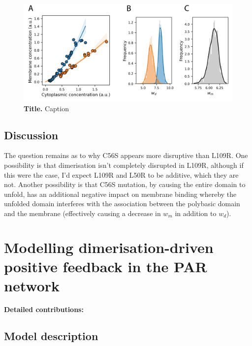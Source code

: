 \documentclass[12pt]{"report"}
\newcommand{\mycaption}[2]{\caption[#1]{\textbf{#1.} #2}}
\begin{document}
\begin{figure}[!h]
\includegraphics[scale=1]{thermodynamic_model_wt_vs_l109r}
\setlength{\abovecaptionskip}{20pt}
\centering
\mycaption{Title}{Caption}
\label{fig:thermodynamic_model_wt_vs_l109r}
\end{figure}


\section{Discussion}



The question remains as to why C56S appears more disruptive than L109R. One possibility is that dimerisation isn’t completely disrupted in L109R, although if this were the case, I’d expect L109R and L50R to be additive, which they are not. Another possibility is that C56S mutation, by causing the entire domain to unfold, has an additional negative impact on membrane binding whereby the unfolded domain interferes with the association between the polybasic domain and the membrane (effectively causing a decrease in $w_m$ in addition to $w_d$).\\

\clearpage
\chapter{Modelling dimerisation-driven positive feedback in the PAR network}

\textbf{Detailed contributions:}\\

\clearpage
\section{Model description}
\end{document}
